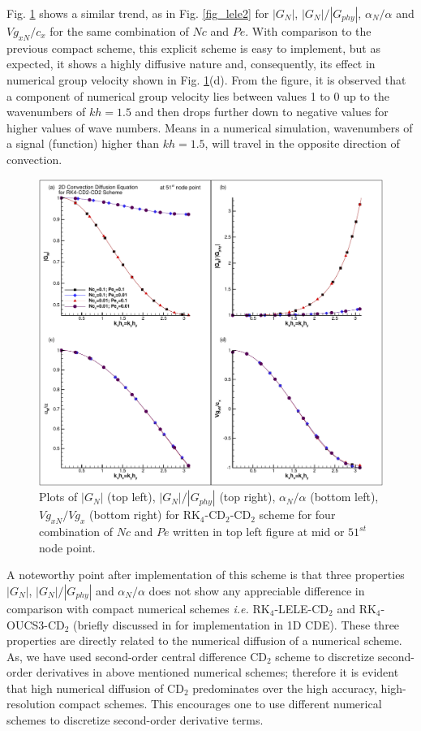 \documentclass[showpacs,preprintnumbers,amsmath,amssymb]{revtex4-1} %
\begin{document}
Fig. \ref{fig_CD2} shows a similar trend, as in Fig. \ref{fig_lele2} for $|G_N|$, $|G_N|/|G_{phy}|$, $\alpha_N/\alpha$ and $Vg_{xN}/c_x$ for the same combination of $Nc$ and $Pe$. With comparison to the previous compact scheme, this explicit scheme is easy to implement, but as expected, it shows a highly diffusive nature and, consequently, its effect in numerical group velocity shown in Fig. \ref{fig_CD2}(d). From the figure, it is observed that a component of numerical group velocity lies between values 1 to 0 up to the wavenumbers of $kh=1.5$ and then drops further down to negative values for higher values of wave numbers. Means in a numerical simulation, wavenumbers of a signal (function) higher than $kh=1.5$, will travel in the opposite direction of convection.

\begin{figure}
\begin{center}
\includegraphics[width=150mm]{prop_CD2_mid_pt.pdf}
\end{center}
\raggedleft
\caption{Plots of $|G_N|$ (top left), $|G_N|/|G_{phy}|$ (top right), $\alpha_N/\alpha$ (bottom left), $Vg_{xN}/Vg_x$ (bottom right) for RK$_4$-CD$_2$-CD$_2$ scheme for four combination of $Nc$ and $Pe$ written in top left figure at mid or $51^{st}$ node point.}
\label{fig_CD2}
\end{figure}

A noteworthy point after implementation of this scheme is that three properties $|G_N|$, $|G_N|/|G_{phy}|$ and $\alpha_N/\alpha$ does not show any appreciable difference in comparison with compact numerical schemes \textit{i.e.} RK$_4$-LELE-CD$_2$ and RK$_4$-OUCS3-CD$_2$ (briefly discussed in \cite{SUMAN_et_al} for implementation in 1D CDE). These three properties are directly related to the numerical diffusion of a numerical scheme. As, we have used second-order central difference CD$_2$ scheme to discretize second-order derivatives in above mentioned numerical schemes; therefore it is evident that high numerical diffusion of CD$_2$ predominates over the high accuracy, high-resolution compact schemes. This encourages one to use different numerical schemes to discretize second-order derivative terms.
\end{document}
